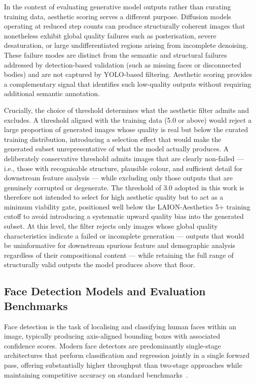 In the context of evaluating generative model outputs rather than curating
training data, aesthetic scoring serves a different purpose. Diffusion
models operating at reduced step counts can produce structurally coherent
images that nonetheless exhibit global quality failures such as
posterisation, severe desaturation, or large undifferentiated regions
arising from incomplete denoising. These failure modes are distinct from
the semantic and structural failures addressed by detection-based
validation (such as missing faces or disconnected bodies) and are not
captured by YOLO-based filtering. Aesthetic scoring provides a
complementary signal that identifies such low-quality outputs without
requiring additional semantic annotation.

Crucially, the choice of threshold determines what the aesthetic filter
admits and excludes. A threshold aligned with the training data (5.0 or
above) would reject a large proportion of generated images whose quality
is real but below the curated training distribution, introducing a
selection effect that would make the generated subset unrepresentative of
what the model actually produces. A deliberately conservative threshold
admits images that are clearly non-failed --- i.e., those with
recognisable structure, plausible colour, and sufficient detail for
downstream feature analysis --- while excluding only those outputs that are
genuinely corrupted or degenerate. The threshold of 3.0 adopted in this
work is therefore not intended to select for high aesthetic quality but to
act as a minimum viability gate, positioned well below the LAION-Aesthetics
5+ training cutoff to avoid introducing a systematic upward quality bias
into the generated subset. At this level, the filter rejects only images
whose global quality characteristics indicate a failed or incomplete
generation --- outputs that would be uninformative for downstream spurious
feature and demographic analysis regardless of their compositional content
--- while retaining the full range of structurally valid outputs the model
produces above that floor.

\subsection{Face Detection Models and Evaluation Benchmarks}

Face detection is the task of localising and classifying human faces within
an image, typically producing axis-aligned bounding boxes with associated
confidence scores. Modern face detectors are predominantly single-stage
architectures that perform classification and regression jointly in a
single forward pass, offering substantially higher throughput than
two-stage approaches while maintaining competitive accuracy on standard
benchmarks~\cite{Deng_2020_RetinaFace}.

